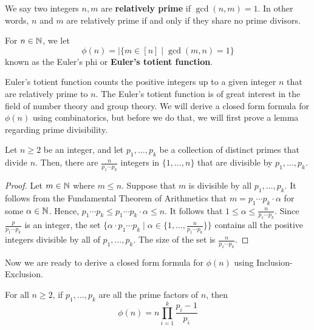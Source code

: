 We say two integers $n,m$ are \textbf{relatively prime} if $\gcd(n,m)=1$. In other words, $n$ and $m$ are relatively prime if and only if they share no prime divisors.

\begin{definition}
    For $n \in \mathbb{N}$, we let
    $$
    \phi(n) = | \{m \in [n] \mid \gcd(m,n) = 1\}
    $$
    known as the Euler's phi or \textbf{Euler's totient function}.
\end{definition}

Euler's totient function counts the positive integers up to a given integer $n$ that are relatively prime to $n$. The Euler's totient function is of great interest in the field of number theory and group theory. We will derive a closed form formula for $\phi(n)$ using combinatorics, but before we do that, we will first prove a lemma regarding prime divisibility.

\begin{lemma}
    Let $n \geq 2$ be an integer, and let $p_1,\ldots,p_k$ be a collection of distinct primes that divide $n$. Then, there are $\frac{n}{p_1\cdots p_k}$ integers in $\{1,\ldots,n\}$ that are divisible by $p_1,\ldots,p_k$.
\end{lemma}

\begin{proof}
    Let $m \in \mathbb{N}$ where $m \leq n$. Suppose that $m$ is divisible by all $p_1,\ldots,p_k$. It follows from the Fundamental Theorem of Arithmetics that $m = p_1 \cdots p_k \cdot \alpha$ for some $\alpha \in \mathbb{N}$. Hence, $p_1 \cdots p_k \leq p_1 \cdots p_k \cdot \alpha \leq n$. It follows that $1 \leq \alpha \leq \frac{n}{p_1 \cdots p_k}$. Since $\frac{p}{p_1\cdots p_k}$ is an integer, the set $\{ \alpha \cdot p_1 \cdots p_k \mid \alpha \in \{1,\ldots,\frac{n}{p_1\cdots p_k}\}\}$ contains all the positive integers divisible by all of $p_1,\ldots,p_k$. The size of the set is $\frac{n}{p_1\cdots p_k}$.
\end{proof}

Now we are ready to derive a closed form formula for $\phi(n)$ using Inclusion-Exclusion.

\begin{theorem}
    For all $n \geq 2$, if $p_1,\ldots,p_k$ are all the prime factors of $n$, then
    $$
    \phi(n) = n \prod_{i=1}^k \frac{p_i - 1}{p_i}
    $$
\end{theorem}

